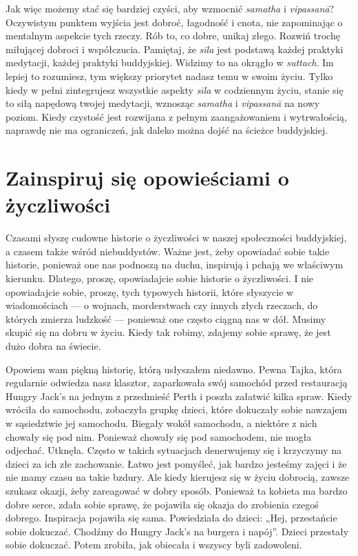 \documentclass[12pt,openany]{book}
\begin{document}
Jak więc możemy stać się bardziej czyści, aby wzmocnić \textit{samatha} i \textit{vipassanā}? Oczywistym punktem wyjścia jest dobroć, łagodność i cnota, nie zapominając o mentalnym aspekcie tych rzeczy. Rób to, co dobre, unikaj złego. Rozwiń trochę miłującej dobroci i współczucia. Pamiętaj, że \textit{sīla} jest podstawą każdej praktyki medytacji, każdej praktyki buddyjskiej. Widzimy to na okrągło w \textit{suttach}. Im lepiej to rozumiesz, tym większy priorytet nadasz temu w swoim życiu. Tylko kiedy w pełni zintegrujesz wszystkie aspek\-ty \textit{sīla} w codziennym życiu, stanie się to siłą napędową twojej medytacji, wznosząc \textit{samatha} i \textit{vipassanā} na nowy poziom. Kiedy czystość jest rozwijana z pełnym zaangażowaniem i wytrwałością, naprawdę nie ma ograniczeń, jak daleko można dojść na ścieżce buddyjskiej.

\section*{Zainspiruj się opowieściami o życzliwości}

Czasami słyszę cudowne historie o życzliwości w naszej społeczności buddyjskiej, a czasem także wśród niebuddystów. Ważne jest, żeby opowiadać sobie takie historie, ponieważ one nas podnoszą na duchu, inspirują i pchają we właściwym kierunku. Dlatego, proszę, opowiadajcie sobie historie o życzliwości. I nie opowiadajcie sobie, proszę, tych typowych historii, które słyszycie w wiadomościach --- o wojnach, morderstwach czy innych złych rzeczach, do których zmierza ludzkość --- ponieważ one często ciągną nas w dół. Musimy skupić się na dobru w życiu. Kiedy tak robimy, zdajemy sobie sprawę, że jest dużo dobra na świecie.

Opowiem wam piękną historię, którą usłyszałem niedawno. Pewna Tajka, która regularnie odwiedza nasz klasztor, zaparkowała swój samochód przed restauracją Hungry Jack’s na jednym z przedmieść Perth i poszła załatwić kilka spraw. Kiedy wróciła do samochodu, zobaczyła grupkę dzieci, które dokuczały sobie nawzajem w sąsiedztwie jej samochodu. Biegały wokół samochodu, a niektóre z nich chowały się pod nim. Ponieważ chowały się pod samochodem, nie mogła odjechać. Utknęła. Często w takich sytuacjach denerwujemy się i krzyczymy na dzieci za ich złe zachowanie. Łatwo jest pomyśleć, jak bardzo jesteśmy zajęci i że nie mamy czasu na takie bzdury. Ale kiedy kierujesz się w życiu dobrocią, zawsze szukasz okazji, żeby zareagować w dobry sposób. Ponieważ ta kobieta ma bardzo dobre serce, zdała sobie sprawę, że pojawiła się okazja do zrobienia czegoś dobrego. Inspiracja pojawiła się sama. Powiedziała do dzieci: „Hej, przestańcie sobie dokuczać. Chodźmy do Hungry Jack’s na burgera i napój”. Dzieci przestały sobie dokuczać. Potem zrobiła, jak obiecała i wszyscy byli zadowoleni.
\end{document}
